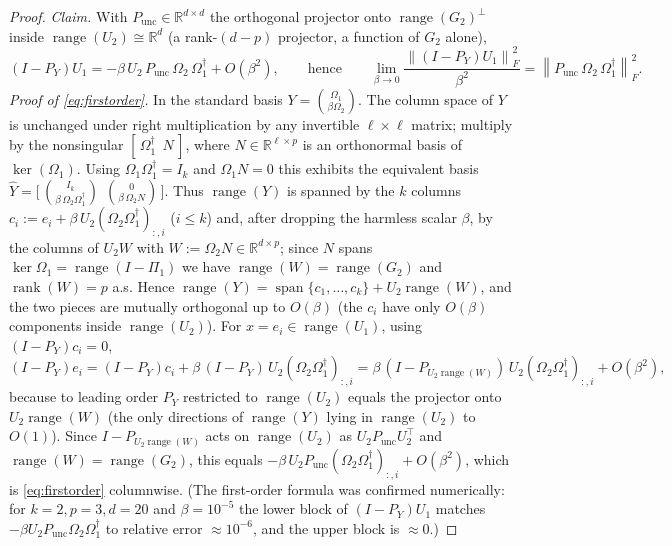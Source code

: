 \documentclass{amsart}
\theoremstyle{definition}
\DeclareMathOperator{\rank}{rank}
\DeclareMathOperator{\range}{range}
\DeclareMathOperator{\spann}{span}
\newcommand{\R}{\mathbb{R}}
\newcommand{\Frob}[1]{\left\lVert #1\right\rVert_F}
\begin{document}
\begin{proof}
\emph{Claim.} With $P_{\mathrm{unc}}\in\R^{d\times d}$ the orthogonal projector
onto $\range(G_2)^{\perp}$ inside $\range(U_2)\cong\R^d$ (a rank-$(d-p)$
projector, a function of $G_2$ alone),
\begin{equation}\label{eq:firstorder}
(I-P_Y)U_1=-\beta\,U_2\,P_{\mathrm{unc}}\,\Omega_2\,\Omega_1^{\dagger}+O(\beta^2),
\qquad\text{hence}\qquad
\lim_{\beta\to0}\frac{\Frob{(I-P_Y)U_1}^2}{\beta^2}
=\Frob{P_{\mathrm{unc}}\,\Omega_2\,\Omega_1^{\dagger}}^2 .
\end{equation}
\emph{Proof of \eqref{eq:firstorder}.} In the standard basis
$Y=\binom{\Omega_1}{\beta\Omega_2}$. The column space of $Y$ is unchanged under
right multiplication by any invertible $\ell\times\ell$ matrix; multiply by the
nonsingular $[\,\Omega_1^{\dagger}\ \ N\,]$, where $N\in\R^{\ell\times p}$ is an
orthonormal basis of $\ker(\Omega_1)$. Using $\Omega_1\Omega_1^{\dagger}=I_k$ and
$\Omega_1 N=0$ this exhibits the equivalent basis
$\widehat Y=\big[\,\binom{I_k}{\beta\,\Omega_2\Omega_1^{\dagger}}\ \ \binom{0}{\beta\,\Omega_2 N}\,\big]$.
Thus $\range(Y)$ is spanned by the $k$ columns
$c_i:=e_i+\beta\,U_2(\Omega_2\Omega_1^{\dagger})_{:,i}$ ($i\le k$) and, after
dropping the harmless scalar $\beta$, by the columns of $U_2 W$ with
$W:=\Omega_2 N\in\R^{d\times p}$; since $N$ spans $\ker\Omega_1=\range(I-\Pi_1)$
we have $\range(W)=\range(G_2)$ and $\rank(W)=p$ a.s. Hence
$\range(Y)=\spann\{c_1,\dots,c_k\}+U_2\range(W)$, and the two pieces are mutually
orthogonal up to $O(\beta)$ (the $c_i$ have only $O(\beta)$ components inside
$\range(U_2)$). For $x=e_i\in\range(U_1)$, using $(I-P_Y)c_i=0$,
\[
(I-P_Y)e_i=(I-P_Y)c_i+\beta\,(I-P_Y)\,U_2(\Omega_2\Omega_1^{\dagger})_{:,i}
=\beta\,(I-P_{U_2\range(W)})\,U_2(\Omega_2\Omega_1^{\dagger})_{:,i}+O(\beta^2),
\]
because to leading order $P_Y$ restricted to $\range(U_2)$ equals the projector
onto $U_2\range(W)$ (the only directions of $\range(Y)$ lying in $\range(U_2)$ to
$O(1)$). Since $I-P_{U_2\range(W)}$ acts on $\range(U_2)$ as
$U_2 P_{\mathrm{unc}}U_2^\top$ and $\range(W)=\range(G_2)$, this equals
$-\beta\,U_2 P_{\mathrm{unc}}(\Omega_2\Omega_1^{\dagger})_{:,i}+O(\beta^2)$,
which is \eqref{eq:firstorder} columnwise. (The first-order formula was confirmed
numerically: for $k=2,p=3,d=20$ and $\beta=10^{-5}$ the lower block of
$(I-P_Y)U_1$ matches $-\beta U_2P_{\mathrm{unc}}\Omega_2\Omega_1^\dagger$ to
relative error $\approx10^{-6}$, and the upper block is $\approx0$.)


\end{proof}
\end{document}
